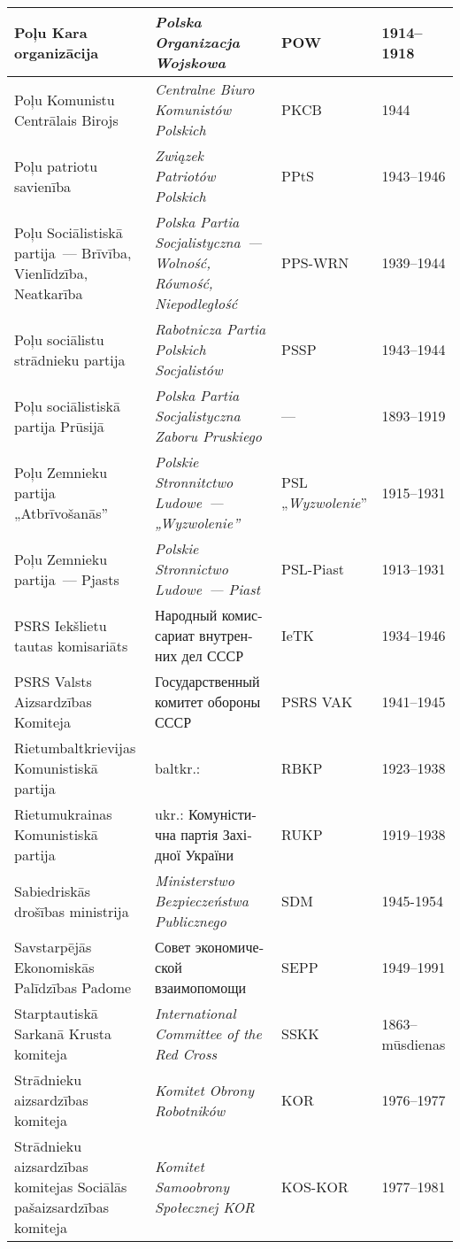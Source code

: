 \documentclass[twoside,a5paper,12pt,fleqn,openany]{extbook}
\newcommand{\pltxti}[1]{\textit{\textpolish{#1}}}
\newcommand{\rutxti}[1]{\textrussian{#1}}
\newcommand{\entxti}[1]{\textit{\textenglish{#1}}}
\newcommand{\betxti}[1]{\textbelarusian{#1}}
\newcommand{\uktxti}[1]{\textukrainian{#1}}
\begin{document}
\begin{footnotesize}
\begin{tabularx}{\linewidth}{|p{3cm}|p{3.5cm}|p{1.4cm}|p{1.6cm}|}
\hline
Poļu Kara organizācija & \pltxti{Polska Organizacja Wojskowa} & POW & 1914--1918 \\
\hline
Poļu Komunistu Centrālais Birojs & \pltxti{Centralne Biuro Komunistów Polskich} & PKCB & 1944 \\
\hline
Poļu patriotu savienība & \pltxti{Związek Patriotów Polskich} & PPtS & 1943--1946 \\
\hline
Poļu Sociālistiskā partija~--- Brīvība, Vienlīdzība, Neatkarība & \pltxti{Polska Partia Socjalistyczna~--- Wolność, Równość, Niepodległość} & PPS-WRN & 1939--1944 \\
\hline
Poļu sociālistu strādnieku partija & \pltxti{Rabotnicza Partia Polskich Socjalistów} & PSSP & 1943--1944 \\
\hline
Poļu sociālistiskā partija Prūsijā & \pltxti{Polska Partia Socjalistyczna Zaboru Pruskiego} & --- & 1893--1919 \\
\hline
Poļu Zemnieku partija „Atbrīvošanās” & \pltxti{Polskie Stronnitctwo Ludowe~--- „Wyzwolenie”} & PSL „\pltxti{Wyzwolenie}” & 1915--1931 \\
\hline
Poļu Zemnieku partija~--- Pjasts & \pltxti{Polskie Stronnictwo Ludowe~--- Piast} & PSL-Piast & 1913--1931 \\
\hline
PSRS Iekšlietu tautas komisariāts & \rutxti{Народный комиссариат внутренних дел СССР} & IeTK & 1934--1946 \\
\hline
PSRS Valsts Aizsardzības Komiteja & \rutxti{Государственный комитет обороны СССР} & PSRS VAK & 1941--1945 \\
\hline
Rietumbaltkrievijas Komunistiskā partija & baltkr.: \betxti{Камуністычная партыя Заходняй Беларусі} & RBKP & 1923--1938 \\
\hline
Rietumukrainas Komunistiskā partija & ukr.: \uktxti{Комуністична партія Західної України} & RUKP & 1919--1938 \\
\hline
Sabiedriskās drošības ministrija & \pltxti{Ministerstwo Bezpieczeństwa Publicznego} & SDM & 1945-1954 \\
\hline
Savstarpējās Ekonomiskās Palīdzības Padome & \rutxti{Совет экономической взаимопомощи} & SEPP & 1949--1991 \\
\hline
Starptautiskā Sarkanā Krusta komiteja & \entxti{International Committee of the Red Cross} & SSKK & 1863--mūsdienas \\
\hline
Strādnieku aizsardzības komiteja & \pltxti{Komitet Obrony Robotników} & KOR & 1976--1977 \\
\hline
Strādnieku aizsardzības komitejas Sociālās pašaizsardzības komiteja & \pltxti{Komitet Samoobrony Społecznej KOR} & KOS-KOR & 1977--1981 \\

\end{tabularx}
\end{footnotesize}
\end{document}
